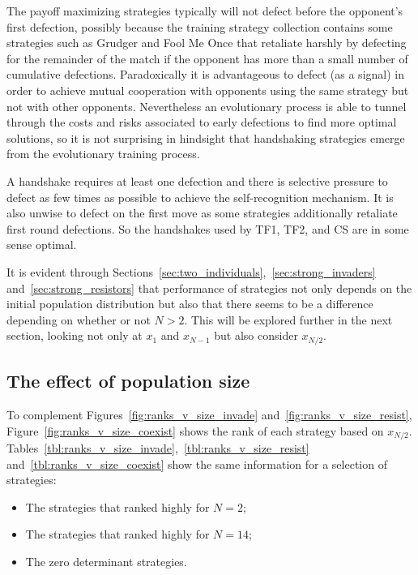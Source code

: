\documentclass{article}
\begin{document}
The payoff maximizing strategies typically will not defect before the opponent's
first defection, possibly because the training strategy collection contains some
strategies such as Grudger and Fool Me Once that retaliate harshly by defecting
for the remainder of the match if the opponent has more than a small number of
cumulative defections. Paradoxically it is advantageous to defect (as a signal)
in order to achieve mutual cooperation with opponents using the same strategy
but not with other opponents. Nevertheless an evolutionary process is able to
tunnel through the costs and risks associated to early defections to find more
optimal solutions, so it is not surprising in hindsight that handshaking
strategies emerge from the evolutionary training process.

A handshake requires at least one defection and there is
selective pressure to defect as few times as possible to achieve the
self-recognition mechanism. It is also unwise to defect on the first move as
some strategies additionally retaliate first round defections. So the
handshakes used by TF1, TF2, and CS are in some sense optimal.

It is evident through
Sections~\ref{sec:two_individuals},~\ref{sec:strong_invaders}
and~\ref{sec:strong_resistors} that performance of strategies not only depends
on the initial population distribution but also that there seems to be a
difference depending on whether or not \(N>2\). This will be explored further in
the next section, looking not only at \(x_1\) and \(x_{N-1}\) but also consider
\(x_{N/2}\).

\subsection{The effect of population size}\label{sec:population_size}

To complement Figures~\ref{fig:ranks_v_size_invade}
and~\ref{fig:ranks_v_size_resist}, Figure~\ref{fig:ranks_v_size_coexist} shows
the rank of each strategy based on \(x_{N/2}\).
Tables~\ref{tbl:ranks_v_size_invade},~\ref{tbl:ranks_v_size_resist}
and~\ref{tbl:ranks_v_size_coexist} show the same information for a selection of
strategies:

\begin{itemize}
    \item The strategies that ranked highly for \(N=2\);
    \item The strategies that ranked highly for \(N=14\);
    \item The zero determinant strategies.
\end{itemize}
\end{document}

